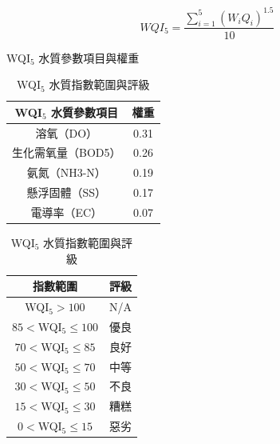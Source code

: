 \documentclass[12pt,a4paper]{article}
\begin{document}
\begin{enumerate}
\begin{enumerate}[label=\arabic*.]
\begin{enumerate}[label=3-2-\arabic*.]
        \begin{equation}
            WQI_5 = \frac{\sum_{i=1}^5 (W_i Q_i)^{1.5}}{10}
        \end{equation}
            \begin{table}[H]
                \centering
                \begin{minipage}{0.45\textwidth}
                    \centering
                    \caption{WQI$_5$ 水質參數項目與權重}
                    \begin{tabular}{cc}
                    \hline
                    WQI$_5$ 水質參數項目 & 權重 \\
                    \hline
                    溶氧（DO） & 0.31 \\
                    生化需氧量（BOD5） & 0.26 \\
                    氨氮（NH3-N） & 0.19 \\
                    懸浮固體（SS） & 0.17 \\
                    電導率（EC） & 0.07 \\
                    \hline
                    \end{tabular}
                    \label{table:wqi_weights}
                \end{minipage}
                \begin{minipage}{0.45\textwidth}
                    \centering
                    \caption{WQI$_5$ 水質指數範圍與評級}
                    \begin{tabular}{cc}
                    \hline
                    指數範圍 & 評級 \\
                    \hline
                    WQI$_5>100$ & N/A \\
                    $85<$WQI$_5\leq100$ & 優良 \\
                    $70<$WQI$_5\leq85$ & 良好 \\
                    $50<$WQI$_5\leq70$ & 中等 \\
                    $30<$WQI$_5\leq50$ & 不良 \\
                    $15<$WQI$_5\leq30$ & 糟糕 \\
                    $0<$WQI$_5\leq15$ & 惡劣 \\
                    \hline
                    \end{tabular}
                    \label{table:wqi_grades}
                \end{minipage}
            \end{table}

\end{enumerate}
\end{enumerate}
\end{enumerate}
\end{document}
